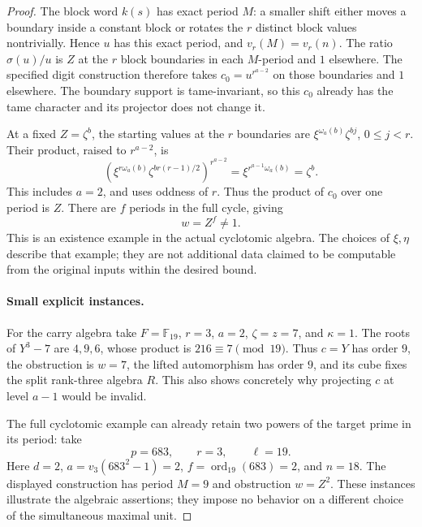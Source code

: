 \documentclass[11pt]{article}
\theoremstyle{definition}
\theoremstyle{remark}
\begin{document}
\begin{proof}
The block word \(k(s)\) has exact period \(M\):
a smaller shift either moves a boundary inside a constant block
or rotates the \(r\) distinct block values nontrivially.
Hence \(u\) has this exact period, and
\(v_r(M)=v_r(n)\).
The ratio \(\sigma(u)/u\) is \(Z\) at the \(r\)
block boundaries in each \(M\)-period and \(1\) elsewhere.
The specified digit construction therefore takes
\(c_0=u^{r^{a-2}}\) on those boundaries and \(1\) elsewhere.
The boundary support is tame-invariant, so this \(c_0\)
already has the tame character and its projector does not
change it.

At a fixed \(Z=\zeta^b\), the starting values at the
\(r\) boundaries are
\(\xi^{\omega_a(b)}\zeta^{bj}\), \(0\leq j<r\).
Their product, raised to \(r^{a-2}\), is
\[
 \left(\xi^{r\omega_a(b)}
             \zeta^{b r(r-1)/2}\right)^{r^{a-2}}
          =\xi^{r^{a-1}\omega_a(b)}=\zeta^b.
\]
This includes \(a=2\), and uses oddness of \(r\).
Thus the product of \(c_0\) over one period is \(Z\).
There are \(f\) periods in the full cycle, giving
\[
                                w=Z^f\ne1.
\]
This is an existence example in the actual cyclotomic algebra.
The choices of \(\xi,\eta\) describe that example; they are
not additional data claimed to be computable from the original
inputs within the desired bound.

\paragraph{Small explicit instances.}
For the carry algebra take \(F=\mathbb F_{19}\), \(r=3\),
\(a=2\), \(\zeta=z=7\), and \(\kappa=1\).
The roots of \(Y^3-7\) are \(4,9,6\), whose product is
\(216\equiv7\pmod{19}\).
Thus \(c=Y\) has order \(9\), the obstruction is \(w=7\),
the lifted automorphism has order \(9\), and its cube fixes
the split rank-three algebra \(R\).
This also shows concretely why projecting \(c\) at level
\(a-1\) would be invalid.

The full cyclotomic example can already retain two powers
of the target prime in its period: take
\[
             p=683,\qquad r=3,\qquad\ell=19.
\]
Here \(d=2\), \(a=v_3(683^2-1)=2\),
\(f=\operatorname{ord}_{19}(683)=2\), and \(n=18\).
The displayed construction has period \(M=9\) and
obstruction \(w=Z^2\).
These instances illustrate the algebraic assertions;
they impose no behavior on a different choice of the
simultaneous maximal unit.
\end{proof}
\end{document}
